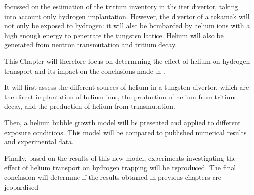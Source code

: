  focussed on the estimation of the tritium inventory in the \gls{iter} \gls{divertor}, taking into account only hydrogen implantation.
However, the \gls{divertor} of a \gls{tokamak} will not only be exposed to hydrogen: it will also be bombarded by helium ions with a high enough energy to penetrate the tungsten lattice.
Helium will also be generated from neutron transmutation and tritium decay.

This Chapter will therefore focus on determining the effect of helium on hydrogen transport and its impact on the conclusions made in .

It will first assess the different sources of helium in a tungsten \gls{divertor}, which are the direct implantation of helium ions, the production of helium from tritium decay, and the production of helium from \gls{transmutation}.

Then, a helium bubble growth model will be presented and applied to different exposure conditions.
This model will be compared to published numerical results and experimental data.

Finally, based on the results of this new model, experiments investigating the effect of helium transport on hydrogen trapping will be reproduced.
The final conclusion will determine if the results obtained in previous chapters are jeopardised.
